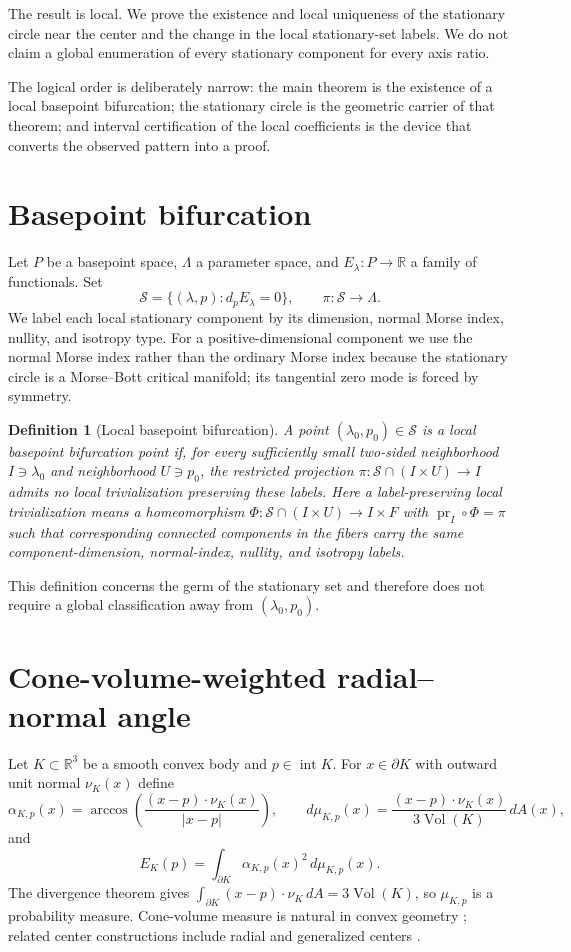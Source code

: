 \documentclass[11pt]{article}
\newtheorem{definition}[theorem]{Definition}
\begin{document}
The result is local. We prove the existence and local uniqueness of the stationary circle near the center and the change in the local stationary-set labels. We do not claim a global enumeration of every stationary component for every axis ratio.

The logical order is deliberately narrow: the main theorem is the existence of a local basepoint bifurcation; the stationary circle is the geometric carrier of that theorem; and interval certification of the local coefficients is the device that converts the observed pattern into a proof.

\section{Basepoint bifurcation}
Let $P$ be a basepoint space, $\Lambda$ a parameter space, and $E_\lambda:P\to\mathbb R$ a family of functionals. Set
\[
\mathcal S=\{(\lambda,p):d_pE_\lambda=0\},\qquad \pi:\mathcal S\to\Lambda.
\]
We label each local stationary component by its dimension, normal Morse index, nullity, and isotropy type. For a positive-dimensional component we use the normal Morse index rather than the ordinary Morse index because the stationary circle is a Morse--Bott critical manifold; its tangential zero mode is forced by symmetry.

\begin{definition}[Local basepoint bifurcation]
A point $(\lambda_0,p_0)\in\mathcal S$ is a local basepoint bifurcation point if, for every sufficiently small two-sided neighborhood $I\ni\lambda_0$ and neighborhood $U\ni p_0$, the restricted projection $\pi:\mathcal S\cap(I\times U)\to I$ admits no local trivialization preserving these labels.
Here a label-preserving local trivialization means a homeomorphism $\Phi:\mathcal S\cap(I\times U)\to I\times F$ with $\operatorname{pr}_I\circ\Phi=\pi$ such that corresponding connected components in the fibers carry the same component-dimension, normal-index, nullity, and isotropy labels.
\end{definition}

This definition concerns the germ of the stationary set and therefore does not require a global classification away from $(\lambda_0,p_0)$.

\section{Cone-volume-weighted radial--normal angle}
Let $K\subset\mathbb R^3$ be a smooth convex body and $p\in\operatorname{int}K$. For $x\in\partial K$ with outward unit normal $\nu_K(x)$ define
\[
\alpha_{K,p}(x)=\arccos\!\left(\frac{(x-p)\cdot\nu_K(x)}{|x-p|}\right),
\qquad
d\mu_{K,p}(x)=\frac{(x-p)\cdot\nu_K(x)}{3\operatorname{Vol}(K)}\,dA(x),
\]
and
\[
E_K(p)=\int_{\partial K}\alpha_{K,p}(x)^2\,d\mu_{K,p}(x).
\]
The divergence theorem gives $\int_{\partial K}(x-p)\cdot\nu_K\,dA=3\operatorname{Vol}(K)$, so $\mu_{K,p}$ is a probability measure. Cone-volume measure is natural in convex geometry \cite{BoroczkyHenk,BLYZ,HLYZ}; related center constructions include radial and generalized centers \cite{HMP,Moszynska,OHara,Sakata}.
\end{document}
